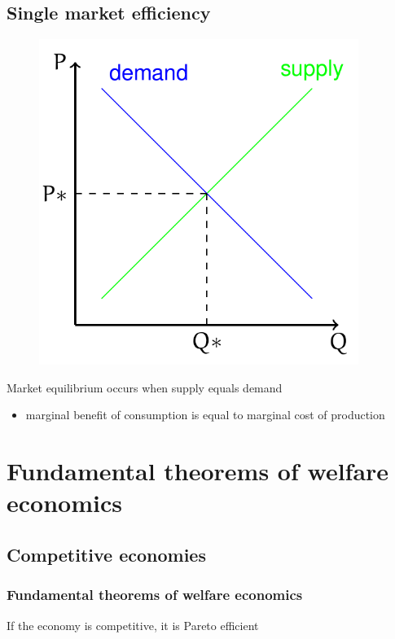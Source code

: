 \documentclass[class=report, crop=false, 12pt,a4paper]{standalone}
\begin{document}
\subsection{Single market efficiency}
\begin{figure}[H]
	\centering
	\includegraphics[width =0.5 \textwidth]{../img/figure10.png}
	\caption{}
\end{figure}
Market equilibrium occurs when supply equals demand
\begin{itemize}
	\item marginal benefit of consumption is equal to marginal cost of production
\end{itemize}
\section{Fundamental theorems of welfare economics}
\subsection{Competitive economies}
\subsubsection{Fundamental theorems of welfare economics}
If the economy is competitive, it is Pareto efficient
\end{document}
